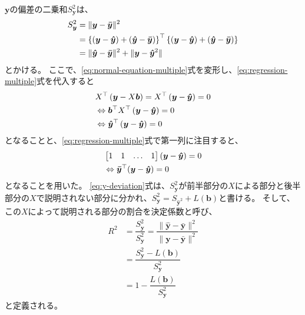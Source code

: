 $\bm{y}$の偏差の二乗和$S_{\bm{y}}^2$は、
\begin{align}\label{eq:y-deviation}
	S_{\bm{y}}^2 & = \| \bm{y} - \bm{\bar{y}} \|^2 \nonumber                                                                                                                         \\
	             & = \left\{ (\bm{y}-\bm{\hat{y}}) + (\bm{\hat{y}} - \bm{\bar{y}}) \right\}^{\top} \left\{  (\bm{y}-\bm{\hat{y}}) + (\bm{\hat{y}} - \bm{\bar{y}})\right\} \nonumber \\
	             & = \| \bm{\hat{y}} - \bm{\bar{y}} \|^2 + \| \bm{y} - \bm{\hat{y}}^2 \|
\end{align}
とかける。
ここで、\ref{eq:normal-equation-multiple}式を変形し、\ref{eq:regression-multiple}式を代入すると
\begin{equation}
	\begin{split}
		 & X^{\top} \left( \bm{y} - X\bm{b} \right) = X^{\top} \left( \bm{y} - \bm{\hat{y}} \right) = 0 \\
		 & \Leftrightarrow \bm{b}^{\top}X^{\top} \left( \bm{y} - \bm{\hat{y}} \right) = 0               \\
		 & \Leftrightarrow \bm{\hat{y}}^{\top} \left( \bm{y} - \bm{\hat{y}} \right) = 0                  \\
	\end{split}
\end{equation}
となることと、\ref{eq:regression-multiple}式で第一列に注目すると、
\begin{equation}
	\begin{split}
		 & \begin{bmatrix}1 & 1 & \dots & 1 \end{bmatrix}
		(\bm{y} - \bm{\hat{y}}) = 0                                         \\
		 & \Leftrightarrow \bm{\bar{y}}^{\top} (\bm{y} - \bm{\hat{y}}) = 0
	\end{split}
\end{equation}
となることを用いた。
\ref{eq:y-deviation}式は、$S_{\bm{y}}^2$が前半部分の$X$による部分と後半部分の$X$で説明されない部分に分かれ、$S_{\bm{y}}^2 = S_{\bm{\hat{y}}^2} + L(\bm{b})$と書ける。
そして、この$X$によって説明される部分の割合を決定係数と呼び、
\begin{align}
	R^2 & = \dfrac{S_{\bm{\hat{y}}}^2}{S_{\bm{y}}^2} = \dfrac{\| \bm{\hat{y}} - \bm{\bar{y}} \|^2}{\| \bm{y} - \bm{\bar{y}} \|^2} \\
	    & = \dfrac{S_{\bm{y}}^2  - L(\bm{b})}{S_{\bm{y}}^2} \nonumber                                                             \\
	    & = 1 - \dfrac{L(\bm{b})}{S_{\bm{y}}^2}
\end{align}
と定義される。
